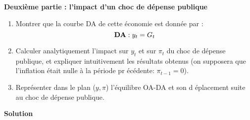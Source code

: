 \documentclass[a4paper,11pt]{article}
\begin{document}
\bigskip

\noindent \textbf{Deuxi\`{e}me partie : l'impact d'un choc de d\'{e}pense
publique}

\begin{enumerate}
\item Montrer que la courbe DA de cette \'{e}conomie est donn\'{e}e par : 
\begin{equation*}
\text{\textbf{DA}}:y_{t}=G_{t}
\end{equation*}

\item Calculer analytiquement l'impact sur $y_{t}$ et sur $\pi _{t}$ du choc
de d\'{e}pense publique, et expliquer intuitivement les r\'{e}sultats
obtenus (on supposera que l'inflation \'{e}tait nulle \`{a} la p\'{e}riode pr%
\'{e}c\'{e}dente: $\pi _{t-1}=0$).

\item Repr\'{e}senter dans le plan ($y,\pi $) l'\'{e}quilibre OA-DA et son d%
\'{e}placement suite au choc de d\'{e}pense publique.
\end{enumerate}



\newpage

\begin{center}
\textbf{Solution}
\end{center}

\bigskip
\end{document}
